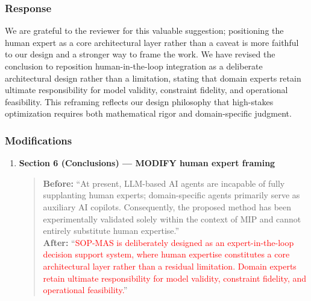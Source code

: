 \documentclass[11pt,a4paper]{article}
\newcommand{\changed}[1]{\textcolor{red}{#1}}
\begin{document}
\subsubsection{Response}
We are grateful to the reviewer for this valuable suggestion; positioning the human expert as a core architectural layer rather than a caveat is more faithful to our design and a stronger way to frame the work. We have revised the conclusion to reposition human-in-the-loop integration as a deliberate architectural design rather than a limitation, stating that domain experts retain ultimate responsibility for model validity, constraint fidelity, and operational feasibility. This reframing reflects our design philosophy that high-stakes optimization requires both mathematical rigor and domain-specific judgment.

\subsubsection{Modifications}
\begin{enumerate}
\item \textbf{Section 6 (Conclusions) --- MODIFY human expert framing}
\begin{quote}
\textbf{Before:} ``At present, LLM-based AI agents are incapable of fully supplanting human experts; domain-specific agents primarily serve as auxiliary AI copilots. Consequently, the proposed method has been experimentally validated solely within the context of MIP and cannot entirely substitute human expertise.''\\[4pt]
\textbf{After:} ``\changed{SOP-MAS is deliberately designed as an expert-in-the-loop decision support system, where human expertise constitutes a core architectural layer rather than a residual limitation. Domain experts retain ultimate responsibility for model validity, constraint fidelity, and operational feasibility.}''
\end{quote}
\end{enumerate}
\end{document}
